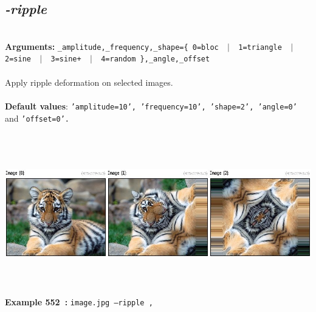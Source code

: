 \documentclass[a4paper,11pt,twoside]{book}
\begin{document}
\subsection{\emph{-ripple} }\vspace*{-0.5em}
~\\\textbf{Arguments: } 
{\small \texttt{\_amplitude,\_frequency,\_shape=\{ 0=bloc ~$|$~ 1=triangle ~$|$~ 2=sine ~$|$~ 3=sine+ ~$|$~ 4=random \},\_angle,\_offset}}\\~\\
Apply ripple deformation on selected images.
~\\~\\\textbf{Default values}: {\small \texttt{'amplitude=10', 'frequency=10', 'shape=2', 'angle=0'} and \texttt{'offset=0'.}}
\begin{center}\includegraphics[keepaspectratio=true,height=7cm,width=\textwidth]{img/gmic_def552.jpg}\\
{\footnotesize \textbf{Example 552~:} \texttt{image.jpg --ripple ,}}
\end{center}
\end{document}
